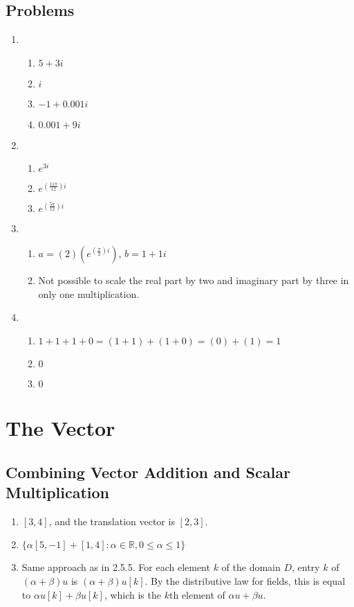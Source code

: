 \documentclass{article}
\begin{document}
    \subsection{Problems}
    \begin{enumerate}
        \addtocounter{enumi}{9}
        \item 
            \begin{enumerate}
                \item $5 + 3i$
                \item $i$
                \item $-1 + 0.001i$
                \item $0.001 + 9i$
            \end{enumerate}
        \item
            \begin{enumerate}
                \item $e^{3i}$
                \item $e^{(\frac{11\pi}{12})i}$
                \item $e^{(\frac{5\pi}{12})i}$
            \end{enumerate}
        \item
            \begin{enumerate}
                \item $a = (2)(e^{(\frac{\pi}{2})i})$, $b = 1 + 1i$
                \item Not possible to scale the real part by two and imaginary
                    part by three in only one multiplication.
            \end{enumerate}
        \item
            \begin{enumerate}
                \item $1 + 1 + 1 + 0 = (1 + 1) + (1 + 0) = (0) + (1) = 1$
                \item $0$
                \item $0$
            \end{enumerate}
    \end{enumerate}
    \section{The Vector}
    \addtocounter{subsection}{5}
    \subsection{Combining Vector Addition and Scalar Multiplication}
    \begin{enumerate}
        \item $[3,4]$, and the translation vector is $[2,3]$. 
        \item $\{\alpha [5,-1] + [1,4] : \alpha \in \mathbb{R}, 0 \leq \alpha \leq 1\}$
        \addtocounter{enumi}{3}
        \item Same approach as in 2.5.5. For each element $k$ of the domain
            $D$, entry $k$ of $(\alpha + \beta)u$ is $(\alpha + \beta)u[k]$. By
            the distributive law for fields, this is equal to $\alpha u[k] +
            \beta u[k]$, which is the $k$th element of $\alpha u + \beta u$.
    \end{enumerate}
\end{document}
